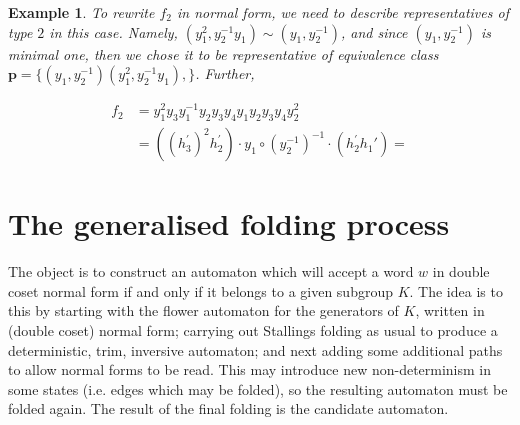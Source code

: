 \documentclass[a4paper,12pt]{article}
\newcommand{\pp}{\mathbf{p}}
\newtheorem{exam}[theorem]{Example}
\newenvironment{example}{\begin{exam} \rm}{\end{exam}}
\numberwithin{equation}{section}
\numberwithin{figure}{section}
\begin{document}
\begin{example}
To rewrite $f_2$ in normal form, we need to describe
representatives of type $2$ in this case. Namely, $(y_1^2,
y_2^{-1}y_1) \sim (y_1,y_2^{-1})$, and since $(y_1,y_2^{-1})$ is
minimal one, then we chose it to be representative of equivalence
class $\pp = \{(y_1,y_2^{-1})(y_1^2, y_2^{-1}y_1),  \}$. Further,

\begin{align*}
f_2 &= y_1^2y_3y_1^{-1}y_2y_3y_4y_1y_2y_3y_4y_2^2\\ &=
((h_3^{\prime})^2h_2^{\prime}) \cdot y_1 \circ (y_2^{-1})^{-1}
\cdot(h_2^{\prime}h_1{\prime})=
\end{align*}


\end{example}


%
%
\section{The generalised folding process}\label{sec:foldings}
The object is to construct an automaton which will accept a word $w$
in double coset normal form if and only if it belongs to a given subgroup $K$.
The idea is to this by starting with the flower automaton for the
generators of $K$, written in (double coset) normal form; carrying out
Stallings folding as usual to produce a deterministic, trim, inversive
automaton; and next adding some additional paths to allow normal forms
to be read. This may introduce new non-determinism in some  states (i.e. edges
which may be folded), so
the resulting automaton must be folded again.
The result of the final folding is the candidate automaton.
\end{document}
